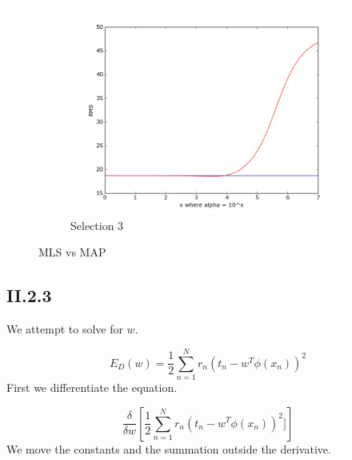\documentclass{article}
\begin{document}
\begin{figure}[!ht]
\begin{subfigure}[b]{0.4\textwidth}
        \includegraphics[width=\textwidth]{Part2/II223.png}
        \caption{Selection 3}
        \label{fig:II223}
    \end{subfigure}
    \caption{MLS vs MAP}
    \label{fig:II22}
\end{figure}




\subsection{II.2.3}

We attempt to solve for $w$.

\begin{equation*}
    E_{D}(w) = \frac{1}{2} \sum_{n=1}^{N} r_n(t_n - w^T\phi(x_n))^2
\end{equation*}
First we differentiate the equation.

\begin{equation*}
  \frac{\delta}{\delta w} \left[ \frac{1}{2}\sum_{n=1}^{N} r_n(t_n -w^T\phi(x_n))^2 ] \right] 
\end{equation*}
We move the constants and the summation outside the derivative.
\end{document}

